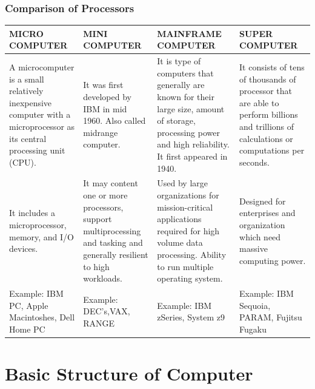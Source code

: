 \documentclass[british]{extreport}
\providecommand{\tabularnewline}{\\}
\begin{document}
\subsection{Comparison of Processors}
\begin{center}
	\begin{tabular}{|>{\raggedright}m{40mm}|>{\raggedright}m{40mm}|>{\raggedright}m{40mm}|>{\raggedright}m{40mm}|}
		\hline
		\textbf{MICRO COMPUTER}                                & \textbf{MINI COMPUTER}                                                    & \textbf{MAINFRAME COMPUTER}                                            & \textbf{SUPER COMPUTER}\tabularnewline
		\hline
		\hline
		A microcomputer is a small relatively inexpensive computer with a
		microprocessor as its central processing unit (CPU).   & It was first developed by IBM in mid 1960. Also called midrange computer. & It is type of computers that generally are known for their large size,
		amount of storage, processing power and high reliability. It first
		appeared in 1940.                                      & It consists of tens of thousands of processor that are able to perform
		billions and trillions of calculations or computations per seconds.\tabularnewline
		\hline
		It includes a microprocessor, memory, and I/O devices. & It may content one or more processors, support multiprocessing and
		tasking and generally resilient to high workloads.     & Used by large organizations for mission-critical applications required
		for high volume data processing. Ability to run multiple operating
		system.                                                & Designed for enterprises and organization which need massive computing
		power.\tabularnewline
		\hline
		Example: IBM PC, Apple Macintoshes, Dell Home PC       & Example: DEC\textquoteright s,VAX, RANGE                                  & Example: IBM zSeries, System z9                                        & Example: IBM Sequoia, PARAM, Fujitsu Fugaku\tabularnewline
		\hline
	\end{tabular}
	\par\end{center}

\chapter{Basic Structure of Computer}

\pagebreak{}
\end{document}
